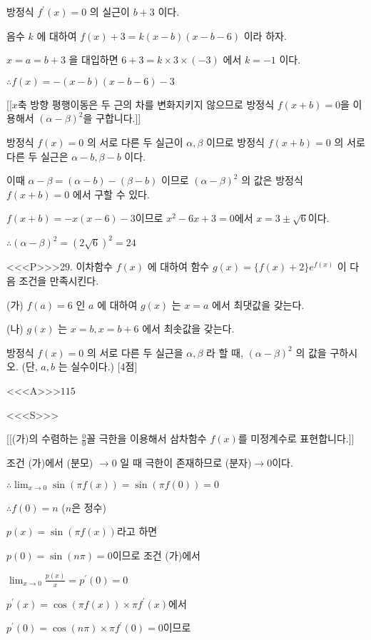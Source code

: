 \documentclass{oblivoir}
\begin{document}
방정식 $f^{\prime}(x)=0$ 의 실근이 $b+3$ 이다.

음수 $k$ 에 대하여 $f(x)+3=k(x-b)(x-b-6)$ 이라 하자.

$x=a=b+3$ 을 대입하면 $6+3=k \times 3 \times(-3)$ 에서 $k=-1$ 이다.

$\therefore f(x)=-(x-b)(x-b-6)-3$

[[$x$축 방향 평행이동은 두 근의 차를 변화지키지 않으므로 방정식 $f(x+b)=0$을 이용해서 $(\alpha-\beta)^{2}$을 구합니다.]]

방정식 $f(x)=0$ 의 서로 다른 두 실근이 $\alpha, \beta$ 이므로 방정식 $f(x+b)=0$ 의 서로 다른 두 실근은 $\alpha-b, \beta-b$ 이다.

이때 $\alpha-\beta=(\alpha-b)-(\beta-b)$ 이므로 $(\alpha-\beta)^{2}$ 의 값은 방정식 $f(x+b)=0$ 에서 구할 수 있다.

$f(x+b)=-x(x-6)-3$이므로 $x^{2}-6 x+3=0$에서 $x=3 \pm \sqrt{6}$이다.

$\therefore(\alpha-\beta)^{2}=(2 \sqrt{6})^{2}=24$



<<<P>>>29. 이차함수 $f(x)$ 에 대하여 함수 $g(x)=\{f(x)+2\} e^{f(x)}$ 이 다음 조건을 만족시킨다.

(가) $f(a)=6$ 인 $a$ 에 대하여 $g(x)$ 는 $x=a$ 에서 최댓값을 갖는다.

(나) $g(x)$ 는 $x=b, x=b+6$ 에서 최솟값을 갖는다.

방정식 $f(x)=0$ 의 서로 다른 두 실근을 $\alpha, \beta$ 라 할 때, $(\alpha-\beta)^{2}$ 의 값을 구하시오. (단, $a, b$ 는 실수이다.) [4점]



<<<A>>>$115$

<<<S>>>

[[(가)의 수렴하는 $\frac{0}{0}$꼴 극한을 이용해서 삼차함수 $f(x)$를 미정계수로 표현합니다.]]

조건 (가)에서 (분모) $\rightarrow 0$ 일 때 극한이 존재하므로 (분자)$\rightarrow 0$이다.

$\therefore \lim _{x \rightarrow 0} \sin (\pi f(x))=\sin (\pi f(0))=0 $

$\therefore f(0)=n$ ($n$은 정수)

$p(x)=\sin (\pi f(x))$라고 하면

$p(0)=\sin (n \pi)=0$이므로 조건 (가)에서

$\lim _{x \rightarrow 0} \frac{p(x)}{x}=p^{\prime}(0)=0$

$p^{\prime}(x)=\cos (\pi f(x)) \times \pi f^{\prime}(x)$에서

$p^{\prime}(0)=\cos (n \pi) \times \pi f^{\prime}(0)=0$이므로
\end{document}
